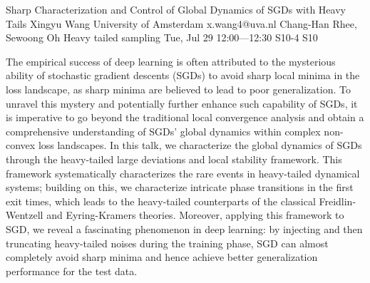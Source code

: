 \begin{talk}
  {Sharp Characterization and Control of Global Dynamics of SGDs with Heavy Tails}%
  {Xingyu Wang}%
  {University of Amsterdam}%
  {x.wang4@uva.nl}%
  {Chang-Han Rhee, Sewoong Oh}%
  {Heavy tailed sampling}%
  {Tue, Jul 29 12:00---12:30}%
  {S10-4}%
  {S10}%
    
   
The empirical success of deep learning is often attributed to the mysterious ability of stochastic gradient descents (SGDs) to avoid sharp local minima in the loss landscape, as sharp minima are believed to lead to poor generalization. To unravel this mystery and potentially further enhance such capability of SGDs, it is imperative to go beyond the traditional local convergence analysis and obtain a comprehensive understanding of SGDs' global dynamics within complex non-convex loss landscapes. In this talk, we characterize the global dynamics of SGDs through the heavy-tailed large deviations and local stability framework. This framework systematically characterizes the rare events in heavy-tailed dynamical systems; building on this, we characterize intricate phase transitions in the first exit times, which leads to the heavy-tailed counterparts of the classical Freidlin-Wentzell and Eyring-Kramers theories. Moreover, applying this framework to SGD, we reveal a fascinating phenomenon in deep learning: by injecting and then truncating heavy-tailed noises during the training phase, SGD can almost completely avoid sharp minima and hence achieve better generalization performance for the test data.



\end{talk}

